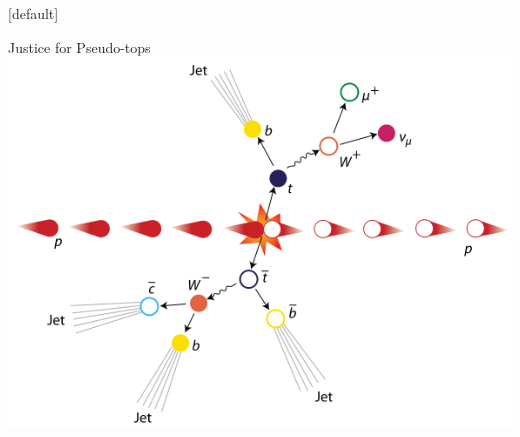 \documentclass{beamer}
\begin{document}
{  \makeatletter %
  [default]
  \def\beamer@entrycode{\vspace*{-1.075\headheight}}
  \begin{frame}{Justice for Pseudo-tops}
    \includegraphics[width=\textwidth]{figures/ttbar_event_wiki}
  \end{frame}

}

\setcounter{framenumber}{\value{finalframe}}
\end{document}
